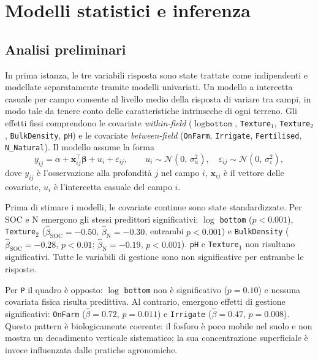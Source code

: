\documentclass[11pt, a4paper]{article}
\begin{document}
\section{Modelli statistici e inferenza}
\label{sec:modello}

\subsection{Analisi preliminari}

In prima istanza, le tre variabili risposta sono state trattate come indipendenti e modellate separatamente tramite modelli univariati.
Un modello a intercetta casuale per campo consente al 
livello medio della risposta di variare tra campi, in modo tale da tenere conto delle caratteristiche intrinseche di ogni terreno. Gli effetti fissi comprendono le 
covariate \textit{within-field} ($\log \texttt{bottom}$, \texttt{Texture$_1$}, \texttt{Texture$_2$}, 
\texttt{BulkDensity}, \texttt{pH}) e le covariate \textit{between-field} (\texttt{OnFarm}, \texttt{Irrigate}, 
\texttt{Fertilised}, \texttt{N\_Natural}). Il modello assume la forma
%
\begin{equation}
	y_{ij} = \alpha + \mathbf{x}_{ij}^\top \boldsymbol{\beta} + u_i + \varepsilon_{ij},
	\qquad u_i \sim \mathcal{N}(0,\, \sigma^2_u), 
	\quad \varepsilon_{ij} \sim \mathcal{N}(0,\, \sigma^2_\varepsilon),
	\label{eq:ri}
\end{equation}
%
dove $y_{ij}$ è l'osservazione alla profondità $j$ nel campo $i$, 
$\mathbf{x}_{ij}$ è il vettore delle covariate, $u_i$ è l'intercetta casuale del campo $i$.

Prima di stimare i modelli, le covariate continue sono state standardizzate.
Per SOC e N emergono gli stessi predittori significativi:
$\log$ \texttt{bottom} ($p < 0.001$), \texttt{Texture$_2$}
($\hat\beta_{\mathrm{SOC}} = -0.50$, $\hat\beta_{\mathrm{N}} = -0.30$,
entrambi $p < 0.001$) e \texttt{BulkDensity}
($\hat\beta_{\mathrm{SOC}} = -0.28$, $p < 0.01$;
 $\hat\beta_{\mathrm{N}} = -0.19$, $p < 0.001$).
\texttt{pH} e \texttt{Texture$_1$} non risultano significativi.
Tutte le variabili di gestione sono non significative per entrambe le risposte.

Per \texttt{P} il quadro \`e opposto: $\log$ \texttt{bottom} non \`e significativo ($p = 0.10$)
e nessuna covariata fisica risulta predittiva. Al contrario, emergono effetti di
gestione significativi: \texttt{OnFarm} ($\hat\beta = 0.72$, $p = 0.011$) e
\texttt{Irrigate} ($\hat\beta = 0.47$, $p = 0.008$).
Questo pattern \`e biologicamente coerente: il fosforo \`e poco mobile nel
suolo e non mostra un decadimento verticale sistematico; la sua concentrazione
superficiale \`e invece influenzata dalle pratiche agronomiche.
\end{document}
